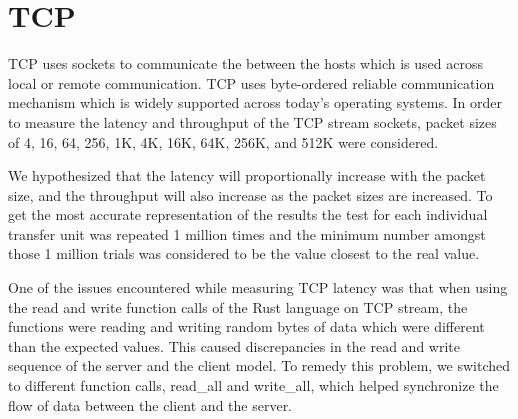 \section{TCP}
TCP uses sockets to communicate the between the hosts which is used across local or remote communication. TCP uses byte-ordered reliable communication mechanism which is widely supported across today's operating systems. In order to measure the latency and throughput of the TCP stream sockets, packet sizes of 4, 16, 64, 256, 1K, 4K, 16K, 64K, 256K, and 512K were considered.

We hypothesized that the latency will proportionally increase with the packet size, and the throughput will also increase as the packet sizes are increased. To get the most accurate representation of the results the test for each individual transfer unit was repeated 1 million times and the minimum number amongst those 1 million trials was considered to be the value closest to the real value.

One of the issues encountered while measuring TCP latency was that when using the read and write function calls of the Rust language on TCP stream, the functions were reading and writing random bytes of data which were different than the expected values. This caused discrepancies in the read and write sequence of the server and the client model. To remedy this problem, we switched to different function calls, read_all and write_all, which helped synchronize the flow of data between the client and the server.
